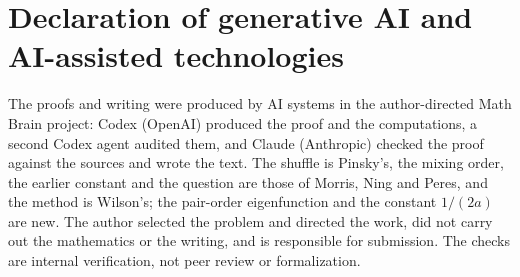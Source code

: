 \documentclass[11pt,a4paper]{article}
\numberwithin{equation}{section}
\theoremstyle{remark}
\begin{document}
\section*{Declaration of generative AI and AI-assisted technologies}
The proofs and writing were produced by AI systems in the author-directed Math Brain project: Codex (OpenAI) produced the proof and the computations, a second Codex agent audited them, and Claude (Anthropic) checked the proof against the sources and wrote the text. The shuffle is Pinsky's, the mixing order, the earlier constant and the question are those of Morris, Ning and Peres, and the method is Wilson's; the pair-order eigenfunction and the constant $1/(2a)$ are new. The author selected the problem and directed the work, did not carry out the mathematics or the writing, and is responsible for submission. The checks are internal verification, not peer review or formalization.
\end{document}
